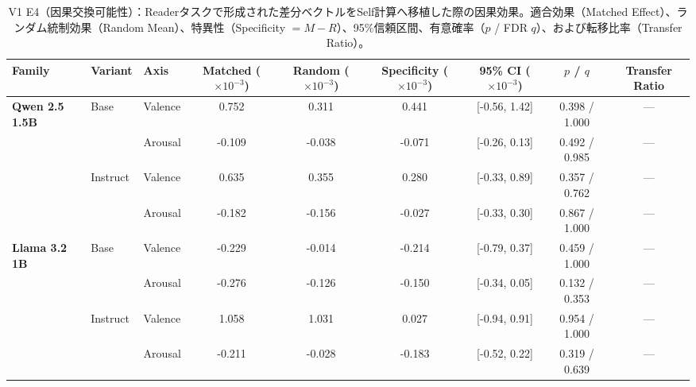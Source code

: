 \begin{table}[htbp]
\centering
\small
\caption{V1 E4（因果交換可能性）：Readerタスクで形成された差分ベクトルをSelf計算へ移植した際の因果効果。適合効果（Matched Effect）、ランダム統制効果（Random Mean）、特異性（Specificity $= M - R$）、95\%信頼区間、有意確率（$p$ / FDR $q$）、および転移比率（Transfer Ratio）。}
\label{tab:v1_interchangeability}
\begin{tabular}{lll ccccc c}
\toprule
\textbf{Family} & \textbf{Variant} & \textbf{Axis} & \textbf{Matched ($\times 10^{-3}$)} & \textbf{Random ($\times 10^{-3}$)} & \textbf{Specificity ($\times 10^{-3}$)} & \textbf{95\% CI ($\times 10^{-3}$)} & $p$ / $q$ & \textbf{Transfer Ratio} \\
\midrule
\multirow{4}{*}{\textbf{Qwen 2.5 1.5B}} & \multirow{2}{*}{Base} & Valence  & 0.752            & 0.311            & 0.441            & [-0.56, 1.42]        & 0.398 / 1.000  & ---          \\
                                 &                    & Arousal  & -0.109           & -0.038           & -0.071           & [-0.26, 0.13]        & 0.492 / 0.985  & ---          \\
\cmidrule(lr){2-9}
                                 & \multirow{2}{*}{Instruct} & Valence  & 0.635            & 0.355            & 0.280            & [-0.33, 0.89]        & 0.357 / 0.762  & ---          \\
                                 &                    & Arousal  & -0.182           & -0.156           & -0.027           & [-0.33, 0.30]        & 0.867 / 1.000  & ---          \\
\midrule
\multirow{4}{*}{\textbf{Llama 3.2 1B}} & \multirow{2}{*}{Base} & Valence  & -0.229           & -0.014           & -0.214           & [-0.79, 0.37]        & 0.459 / 1.000  & ---          \\
                                 &                    & Arousal  & -0.276           & -0.126           & -0.150           & [-0.34, 0.05]        & 0.132 / 0.353  & ---          \\
\cmidrule(lr){2-9}
                                 & \multirow{2}{*}{Instruct} & Valence  & 1.058            & 1.031            & 0.027            & [-0.94, 0.91]        & 0.954 / 1.000  & ---          \\
                                 &                    & Arousal  & -0.211           & -0.028           & -0.183           & [-0.52, 0.22]        & 0.319 / 0.639  & ---          \\

\end{tabular}
\end{table}
